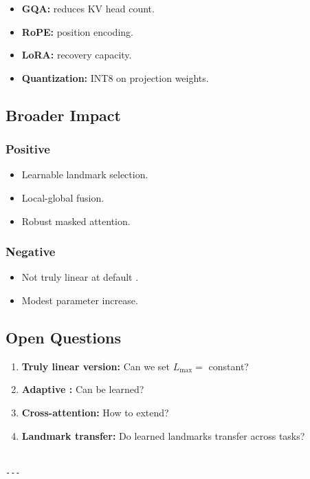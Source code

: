 \begin{itemize}
\item \textbf{GQA:} reduces KV head count.
\item \textbf{RoPE:} position encoding.
\item \textbf{LoRA:} recovery capacity.
\item \textbf{Quantization:} INT8 on projection weights.

\end{itemize}
\subsection{Broader Impact}

\subsubsection{Positive}
\begin{itemize}
\item Learnable landmark selection.
\item Local-global fusion.
\item Robust masked attention.

\end{itemize}
\subsubsection{Negative}
\begin{itemize}
\item Not truly linear at default  .
\item Modest parameter increase.

\end{itemize}
\subsection{Open Questions}

\begin{enumerate}
\item \textbf{Truly linear version:} Can we set $L_\text{max} = $ constant?
\item \textbf{Adaptive  :} Can   be learned?
\item \textbf{Cross-attention:} How to extend?
\item \textbf{Landmark transfer:} Do learned landmarks transfer across tasks?
\end{enumerate}
\begin{lstlisting}

---
\end{lstlisting}